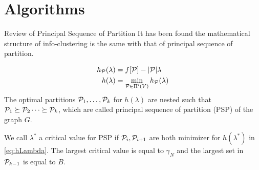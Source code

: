 \documentclass[notheorems]{beamer}
\begin{document}
\section{Algorithms}
\frame{\tableofcontents[currentsection]}
\begin{frame}{Review of Principal Sequence of Partition}
It has been found the mathematical structure of info-clustering is the same with that of principal sequence of partition.
\begin{definition}
\begin{align}
h_{\P}(\lambda) &=  f[\P] - \abs{\P} \lambda  \label{eq:hPL}\\
h(\lambda) &= \min_{\P \in \Pi'(V)} h_{\P}(\lambda) \label{eq:hLambda}
\end{align}
The optimal partitions $\P_1, \dots, \P_k$ for $h(\lambda)$ are nested such that $\P_1 \succeq \P_2 \dots \succeq \P_k$,  which are called principal sequence of partition (PSP) of the graph $G$.
\end{definition}
We call $\lambda^*$ a critical value for PSP if $\P_i, \P_{i+1}$ are both minimizer for $h(\lambda^*)$ in \eqref{eq:hLambda}.
The largest critical value is equal to $\gamma_N$ and the largest set in $\P_{k-1}$ is equal to $B$.
\end{frame}
\end{document}
